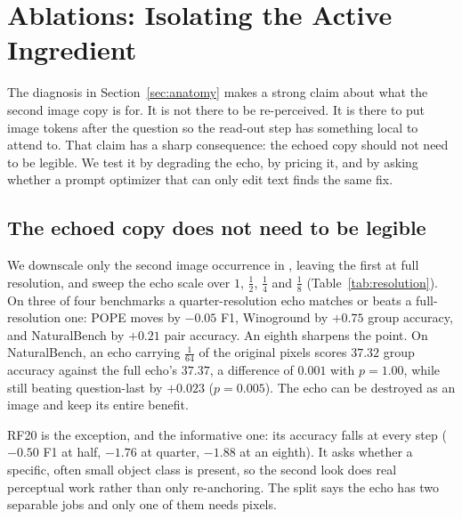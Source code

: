 \section{Ablations: Isolating the Active Ingredient}
\label{sec:ablations}

The diagnosis in Section~\ref{sec:anatomy} makes a strong claim about what the
second image copy is for. It is not there to be re-perceived. It is there to put
image tokens after the question so the read-out step has something local to
attend to. That claim has a sharp consequence: the echoed copy should not need to
be legible. We test it by degrading the echo, by pricing it, and by asking
whether a prompt optimizer that can only edit text finds the same fix.

\subsection{The echoed copy does not need to be legible}
\label{sec:ablation-resolution}

We downscale only the second image occurrence in \sitit{}, leaving the first at
full resolution, and sweep the echo scale over $1$, $\tfrac{1}{2}$,
$\tfrac{1}{4}$ and $\tfrac{1}{8}$ (Table~\ref{tab:resolution}). On three of four
benchmarks a quarter-resolution echo matches or beats a full-resolution one:
POPE moves by $-0.05$ F1, Winoground by $+0.75$ group accuracy, and NaturalBench
by $+0.21$ pair accuracy. An eighth sharpens the point. On NaturalBench, an echo
carrying $\tfrac{1}{64}$ of the original pixels scores $37.32$ group accuracy
against the full echo's $37.37$, a difference of $0.001$ with $p = 1.00$, while
still beating question-last by $+0.023$ ($p = 0.005$). The echo can be destroyed
as an image and keep its entire benefit.

RF20 is the exception, and the informative one: its accuracy falls at every step
($-0.50$ F1 at half, $-1.76$ at quarter, $-1.88$ at an eighth). It asks whether a
specific, often small object class is present, so the second look does real
perceptual work rather than only re-anchoring. The split says the echo has two
separable jobs and only one of them needs pixels.

